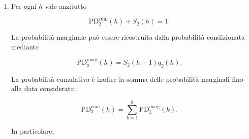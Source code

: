 \begin{enumerate}
Ponendo $S_2(0)=1$, la probabilit\`{a} condizionata di default nel
periodo $h$ \`{e}

\[
\begin{split}
q_2(h)
&=
\Prob
\left(
\tau_D=h
\mid
\tau_D>h-1,\ X_0=2
\right)
\\
&=
\frac{
\mathrm{PD}_{2}^{\mathrm{marg}}(h)
}{
S_2(h-1)
}.
\end{split}
\]

Si ottiene:

\[
\begin{array}{c|cccc}
h
&
\mathrm{PD}_{2}^{\mathrm{cum}}(h)
&
\mathrm{PD}_{2}^{\mathrm{marg}}(h)
&
S_2(h)
&
q_2(h)
\\
\hline
1 & 0.030000 & 0.030000 & 0.970000 & 0.030000\\
2 & 0.079100 & 0.049100 & 0.920900 & 0.050619\\
3 & 0.136709 & 0.057609 & 0.863291 & 0.062557\\
4 & 0.196699 & 0.059990 & 0.803301 & 0.069490\\
5 & 0.255654 & 0.058954 & 0.744346 & 0.073390
\end{array}
\]

Ad esempio, per il secondo anno,

\[
\mathrm{PD}_{2}^{\mathrm{marg}}(2)
=
0.079100-0.030000
=
0.049100,
\]

mentre

\[
q_2(2)
=
\frac{0.049100}{0.970000}
\approx
0.050619.
\]

La prima quantit\`{a} \`{e} una probabilit\`{a} non condizionata,
calcolata rispetto all'intera popolazione iniziale. La seconda \`{e}
invece la probabilit\`{a} di default nel secondo anno, condizionatamente
alla sopravvivenza durante il primo anno.

\item Per ogni $h$ vale anzitutto

\[
\mathrm{PD}_{2}^{\mathrm{cum}}(h)
+
S_2(h)
=
1.
\]

La probabilit\`{a} marginale pu\`{o} essere ricostruita dalla
probabilit\`{a} condizionata mediante

\[
\mathrm{PD}_{2}^{\mathrm{marg}}(h)
=
S_2(h-1)q_2(h).
\]

La probabilit\`{a} cumulativa \`{e} inoltre la somma delle
probabilit\`{a} marginali fino alla data considerata:

\[
\mathrm{PD}_{2}^{\mathrm{cum}}(h)
=
\sum_{k=1}^{h}
\mathrm{PD}_{2}^{\mathrm{marg}}(k).
\]

In particolare,


\end{enumerate}
